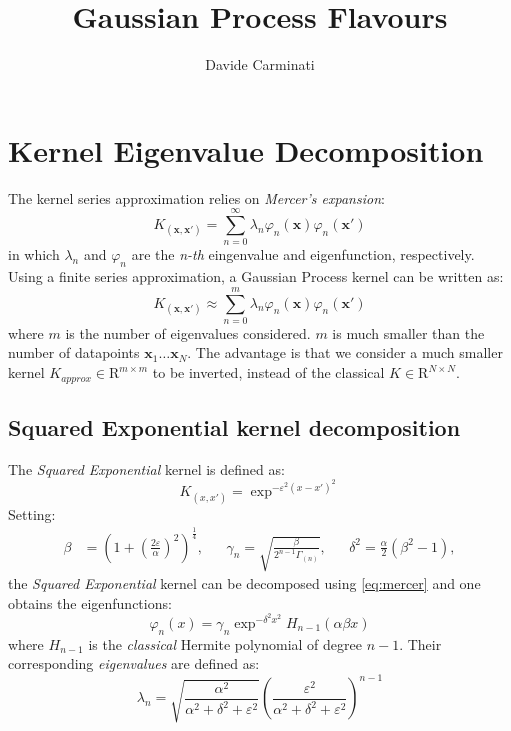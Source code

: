 \documentclass[10pt,a4paper,twocolumn]{article}
\title{\huge Gaussian Process Flavours}
\author{Davide Carminati}
\date{}
\begin{document}
	
\maketitle


\section{Kernel Eigenvalue Decomposition}\label{kernelDec}
The kernel series approximation relies on \textit{Mercer's expansion}:
\begin{equation}\label{eq:mercer}
	K_{(\mathbf{x}, \mathbf{x'})} = \sum_{n=0}^{\infty} \lambda_n \varphi_n(\mathbf{x}) \varphi_n(\mathbf{x'})
\end{equation}
in which $\lambda_n$ and $\varphi_n$ are the \textit{n-th} eingenvalue and eigenfunction, respectively.
Using a finite series approximation, a Gaussian Process kernel can be written as:
\begin{equation}\label{eq:mercerLim}
	K_{(\mathbf{x}, \mathbf{x'})} \approx \sum_{n=0}^{m} \lambda_n \varphi_n(\mathbf{x}) \varphi_n(\mathbf{x'})
\end{equation}
where $m$ is the number of eigenvalues considered. $m$ is much smaller than the number of datapoints $\mathbf{x}_1 \ldots \mathbf{x}_N$. The advantage is that we consider a much smaller kernel $K_{approx} \in \mathrm{R}^{m \times m}$ to be inverted, instead of the classical $K \in \mathrm{R}^{N \times N}$.
\subsection{Squared Exponential kernel decomposition}
The \textit{Squared Exponential} kernel is defined as:
\begin{equation}
	K_{(x,x')} = \exp^ {-\varepsilon^2 (x - x')^2 }
\end{equation}
Setting:
\small
\begin{align}
	 \beta &= \left(1 + \left(\frac{2\varepsilon}{\alpha}\right)^2\right)^\frac{1}{4}, && \gamma_n = \sqrt{\frac{\beta}{2^{n-1}\Gamma_{(n)}}}, && \delta^2 = \frac{\alpha}{2}(\beta^2-1),
\end{align}
\normalsize
the \textit{Squared Exponential} kernel can be decomposed using \autoref{eq:mercer} and one obtains the eigenfunctions:
\begin{equation}\label{eq:SEeigfun}
	\varphi_n(x) = \gamma_n \exp^{-\delta^2 x^2} H_{n-1}(\alpha \beta x)
\end{equation}
where $H_{n-1}$ is the \textit{classical} Hermite polynomial of degree $n-1$.
Their corresponding \textit{eigenvalues} are defined as:
\begin{equation}
	\lambda_n = \sqrt{\frac{\alpha^2}{\alpha^2 + \delta^2 + \varepsilon^2}} \left(\frac{\varepsilon^2}{\alpha^2 + \delta^2 + \varepsilon^2} \right)^{n-1}
\end{equation}
\end{document}
